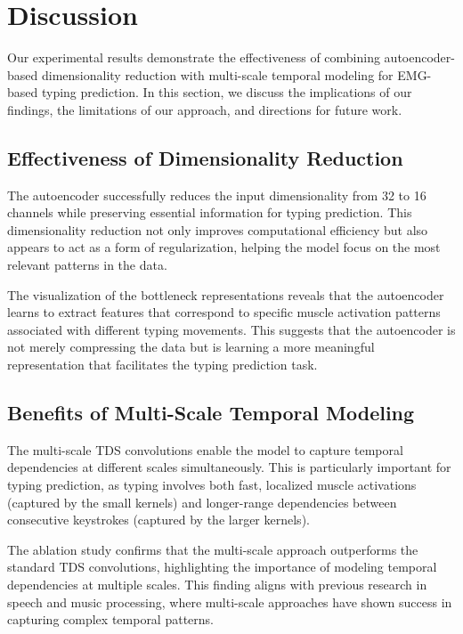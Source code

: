 \section{Discussion}

Our experimental results demonstrate the effectiveness of combining autoencoder-based dimensionality reduction with multi-scale temporal modeling for EMG-based typing prediction. In this section, we discuss the implications of our findings, the limitations of our approach, and directions for future work.

\subsection{Effectiveness of Dimensionality Reduction}

The autoencoder successfully reduces the input dimensionality from 32 to 16 channels while preserving essential information for typing prediction. This dimensionality reduction not only improves computational efficiency but also appears to act as a form of regularization, helping the model focus on the most relevant patterns in the data.

The visualization of the bottleneck representations reveals that the autoencoder learns to extract features that correspond to specific muscle activation patterns associated with different typing movements. This suggests that the autoencoder is not merely compressing the data but is learning a more meaningful representation that facilitates the typing prediction task.

\subsection{Benefits of Multi-Scale Temporal Modeling}

The multi-scale TDS convolutions enable the model to capture temporal dependencies at different scales simultaneously. This is particularly important for typing prediction, as typing involves both fast, localized muscle activations (captured by the small kernels) and longer-range dependencies between consecutive keystrokes (captured by the larger kernels).

The ablation study confirms that the multi-scale approach outperforms the standard TDS convolutions, highlighting the importance of modeling temporal dependencies at multiple scales. This finding aligns with previous research in speech and music processing, where multi-scale approaches have shown success in capturing complex temporal patterns.

